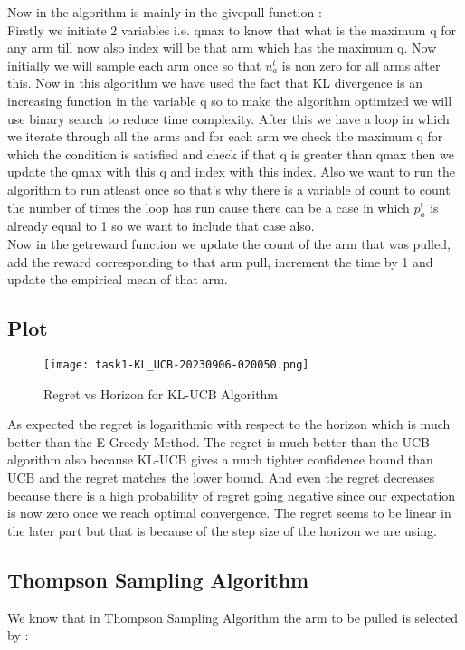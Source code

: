 \documentclass{article}
\begin{document}
Now in the algorithm is mainly in the givepull function :\\
Firstly we initiate 2 variables i.e. qmax to know that what is the maximum q for any arm till now also index will be that arm which has the maximum q. Now initially we will sample each arm once so that $u_a^t$ is non zero for all arms after this. Now in this algorithm we have used the fact that KL divergence is an increasing function in the variable q so to make the algorithm optimized we will use binary search to reduce time complexity. After this we have a loop in which we iterate through all the arms and for each arm we check the maximum q for which the condition is satisfied and check if that q is greater than qmax then we update the qmax with this q and index with this index. Also we want to run the algorithm to run atleast once so that's why there is a variable of count to count the number of times the loop has run cause there can be a case in which $p_a^t$ is already equal to 1 so we want to include that case also.\\

Now in the getreward function we update the count of the arm that was pulled, add the reward corresponding to that arm pull, increment the time by 1 and update the empirical mean of that arm.\\

\subsection{Plot}

\begin{figure}[H]
\centering
\texttt{[image: task1-KL\_UCB-20230906-020050.png]}
\caption{Regret vs Horizon for KL-UCB Algorithm}
\end{figure}


As expected the regret is logarithmic with respect to the horizon which is much better than the E-Greedy Method. The regret is much better than the UCB algorithm also because KL-UCB gives a much tighter confidence bound than UCB and the regret matches the lower bound. And even the regret decreases because there is a high probability of regret going negative since our expectation is now zero once we reach optimal convergence. The regret seems to be linear in the later part but that is because of the step size of the horizon we are using.



\subsection{Thompson Sampling Algorithm}
We know that in Thompson Sampling Algorithm the arm to be pulled is selected by :\\
\end{document}
